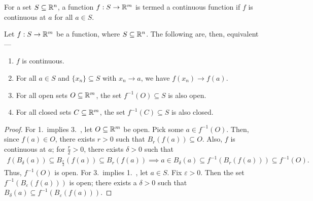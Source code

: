 \begin{definition}
    For a set $S \subseteq \mathbb{R}^{n}$, a function $f:S \to \mathbb{R}^{m}$ is termed a continuous function if $f$ is continuous at $a$ for all $a \in S$.
\end{definition}

\begin{theorem}
    Let $f:S \to \mathbb{R}^{m}$ be a function, where $S \subseteq \mathbb{R}^{n}$. The following are, then, equivalent---
    \begin{enumerate}
        \item $f$ is continuous.
        \item For all $a \in S$ and $\{x_{n}\} \subseteq S$ with $x_{n} \to a$, we have $f(x_{n}) \to f(a)$.
        \item For all open sets $O \subseteq \mathbb{R}^{m}$, the set $f^{-1}(O) \subseteq S$ is also open.
        \item For all closed sets $C \subseteq \mathbb{R}^{m}$, the set $f^{-1}(C) \subseteq S$ is also closed.
    \end{enumerate}
\end{theorem}
\begin{proof}
    For 1.~implies 3.~, let $O \subseteq \mathbb{R}^{m}$ be open. Pick some $a \in f^{-1}(O)$. Then, since $f(a) \in O$, there exists $r > 0$ such that $B_{r}(f(a)) \subseteq O$. Also, $f$ is continuous at $a$; for $\frac{r}{2} > 0$, there exists $\delta > 0$ such that 
    \begin{align}
        f(B_{\delta}(a)) \subseteq B_{\frac{r}{2}}(f(a)) \subseteq B_{r}(f(a)) \implies a \in B_{\delta}(a) \subseteq f^{-1}(B_{r}(f(a))) \subseteq f^{-1}(O).
    \end{align}
    Thus, $f^{-1}(O)$ is open. For 3.~implies 1.~, let $a \in S$. Fix $\varepsilon > 0$. Then the set $f^{-1}(B_{\varepsilon}(f(a)))$ is open; there exists a $\delta > 0$ such that $B_{\delta}(a) \subseteq f^{-1}(B_{\varepsilon}(f(a)))$.
\end{proof}